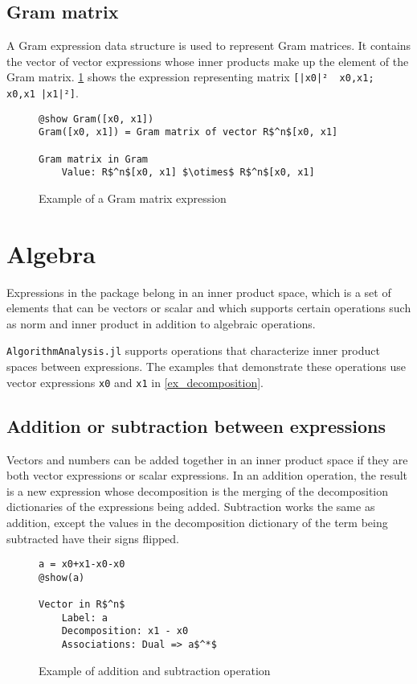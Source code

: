 \subsection*{Gram matrix}
A Gram expression data structure is used to represent Gram matrices. It contains the vector of vector expressions whose inner products make up the element of the Gram matrix. \cref{ex_Gram} shows the expression representing matrix \texttt{[|x0|² \ \textlangle x0,x1\textrangle; \textlangle x0,x1\textrangle \ |x1|²]}.

\begin{figure}[h]
	\begin{lstlisting}[mathescape]
@show Gram([x0, x1])
Gram([x0, x1]) = Gram matrix of vector R$^n$[x0, x1]

Gram matrix in Gram
	Value: R$^n$[x0, x1] $\otimes$ R$^n$[x0, x1]
	\end{lstlisting}
\caption{Example of a Gram matrix expression}
\label{ex_Gram}
\end{figure}

\section{Algebra} \label{sec:algebra}
Expressions in the package belong in an inner product space, which is a set of elements that can be vectors or scalar and which supports certain operations such as norm and inner product in addition to algebraic operations.

\texttt{AlgorithmAnalysis.jl} supports operations that characterize inner product spaces between expressions. The examples that demonstrate these operations use vector expressions \texttt{x0} and \texttt{x1} in \cref{ex_decomposition}.

\subsection*{Addition or subtraction between expressions}

Vectors and numbers can be added together in an inner product space if they are both vector expressions or scalar expressions. In an addition operation, the result is a new expression whose decomposition is the merging of the decomposition dictionaries of the expressions being added. Subtraction works the same as addition, except the values in the decomposition dictionary of the term being subtracted have their signs flipped.

\begin{figure}[!h]
	\begin{lstlisting}[mathescape]
a = x0+x1-x0-x0
@show(a)

Vector in R$^n$
	Label: a
	Decomposition: x1 - x0
	Associations: Dual => a$^*$
	\end{lstlisting}
	\caption{Example of addition and subtraction operation}
	\label{ex_addsub}
\end{figure}

